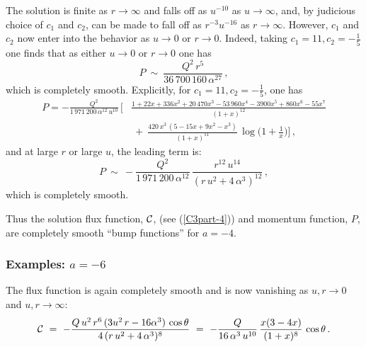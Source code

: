 \documentclass[11pt]{article}
\def\cC{{\cal C}}
\numberwithin{equation}{section}
\begin{document}
The solution is finite  as $r \to \infty$ and falls off as $u^{-10}$ as  $u \to \infty$, and,  by judicious choice of $c_1$ and $c_2$, can be made to fall off as $r^{-3} u^{-16}$  as $r \to \infty$.  However, $c_1$ and $c_2$ now enter into the behavior as $u \to 0$ or $r \to 0$.  Indeed, taking  $c_1 =11, c_2 = -\frac{1}{5}$  one finds that
as either $u \to 0$ or $r \to 0$ one has
%
\begin{equation}
P  ~\sim~ \frac{Q^2\, r^5 }{36\,700\,160 \,\alpha^{27}}  \,,
\label{Psrc-4}
\end{equation}
%
which is completely smooth.  Explicitly, for  $c_1 =11, c_2 = -\frac{1}{5}$, one has 
%
\begin{equation}
\begin{aligned}
P  =- \frac{Q^2}{1\,971\,200 \,\alpha^{12}\, u^{10}} \,\bigg[&  \frac{ 1+ 22  x +336 x^2+ 20\, 470 x^3 - 53\, 960 x^4 - 3900 x^5+860 x^6  -55 x^7  }{(1+x)^{12} }\\
& ~+~ \frac{420\, x^3\, (5 -15x  + 9 x^2 - x^3) }{  (1+x)^{11}}\, \log \bigg(1+ \frac{1}{x}\bigg) \bigg]\,,
\end{aligned}
\label{Ppart-4b}
\end{equation}
%
and at  large $r$ or large $u$, the leading term is:
%
\begin{equation}
P  ~\sim~- \frac{Q^2}{1\,971\,200 \,\alpha^{12}}\,\frac{r^{12} \, u^{14}}{(r \, u^2 + 4 \, \alpha^3)^{12}} \,,
\label{Pasymp-4}
\end{equation}
%
which is completely smooth.

Thus the solution flux function, $\cC$, (see (\ref{C3part-4})) and momentum function, $P$,  are completely smooth ``bump functions'' for $a=-4$.   

\subsubsection{Examples: $a = -6$}
\label{ss:example4} 

The flux function is again completely smooth and is now vanishing as $u, r \to 0$ and  $u,r \to \infty$:
% 
\begin{equation}
\cC ~=~   - \frac{Q\,u^2 \,r^6 \,  (3 u^2 \,r  -16 \alpha^3) \,\cos \theta  }{4\, (r\, u^2 + 4\,\alpha^3 )^8  }~=~   - \frac{Q}{16\, \alpha^3 \, u^{10}}\,\frac{x(3 -4 x)  }{(1+x)^8  }  \,\cos \theta  \,.
 \label{C3part5}
\end{equation}
%
\end{document}
